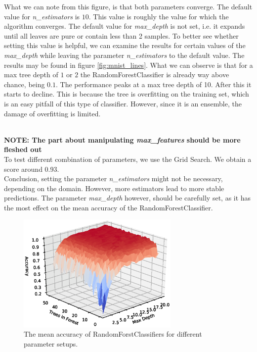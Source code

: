\documentclass[11pt]{article}
\begin{document}
What we can note from this figure, is that both parameters converge. The default value for \textit{n\_estimators} is $10$. This value is roughly the value for which the algorithm converges. The default value for \textit{max\_depth} is not set, i.e. it expands until all leaves are pure or contain less than 2 samples. To better see whether setting this value is helpful, we can examine the results for certain values of the \textit{max\_depth} while leaving the parameter \textit{n\_estimators} to the default value. The results may be found in figure \ref{fig:mnist_lines}. What we can observe is that for a max tree depth of $1$ or $2$ the RandomForestClassifier is already way above chance, being $0.1$. The performance peaks at a max tree depth of 10. After this it starts to decline. This is because the tree is overfitting on the training set, which is an easy pitfall of this type of classifier. However, since it is an ensemble, the damage of overfitting is limited.

~\\ \textbf{NOTE: The part about manipulating \textit{max\_features} should be more fleshed out} \\
To test different combination of parameters, we use the Grid Search. We obtain a score around 0.93.
~\\

Conclusion, setting the parameter \textit{n\_estimators} might not be necessary, depending on the domain. However, more estimators lead to more stable predictions. The parameter \textit{max\_depth} however, should be carefully set, as it has the most effect on the mean accuracy of the RandomForestClassifier.

\begin{figure}[H]
\centering
\includegraphics[width=0.7\textwidth]{images/mnist_results.eps}
\caption{The mean accuracy of RandomForstClassifiers for different parameter setups.}
\label{fig:mnist_results}
\end{figure}
\end{document}
